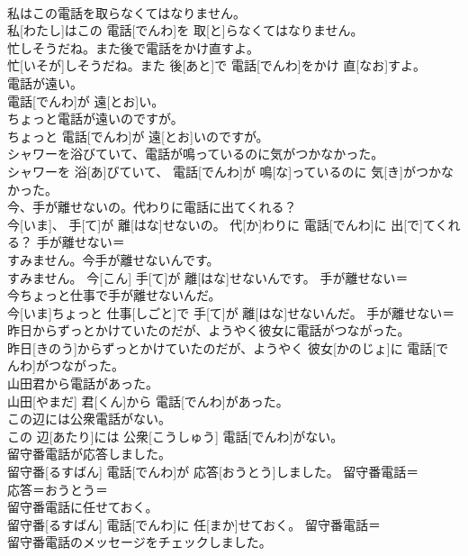 \documentclass[8pt]{extreport}
\begin{document}
\begin{CJK}{UTF8}{min}
\\	私はこの電話を取らなくてはなりません。	
\\	私[わたし]はこの 電話[でんわ]を 取[と]らなくてはなりません。	
\\	忙しそうだね。また後で電話をかけ直すよ。	
\\	忙[いそが]しそうだね。また 後[あと]で 電話[でんわ]をかけ 直[なお]すよ。	
\\	電話が遠い。	
\\	電話[でんわ]が 遠[とお]い。	
\\	ちょっと電話が遠いのですが。	
\\	ちょっと 電話[でんわ]が 遠[とお]いのですが。	
\\	シャワーを浴びていて、電話が鳴っているのに気がつかなかった。	
\\	シャワーを 浴[あ]びていて、 電話[でんわ]が 鳴[な]っているのに 気[き]がつかなかった。	
\\	今、手が離せないの。代わりに電話に出てくれる？	
\\	今[いま]、 手[て]が 離[はな]せないの。 代[か]わりに 電話[でんわ]に 出[で]てくれる？	手が離せない＝ 
\\	すみません。今手が離せないんです。	
\\	すみません。 今[こん] 手[て]が 離[はな]せないんです。	手が離せない＝ 
\\	今ちょっと仕事で手が離せないんだ。	
\\	今[いま]ちょっと 仕事[しごと]で 手[て]が 離[はな]せないんだ。	手が離せない＝ 
\\	昨日からずっとかけていたのだが、ようやく彼女に電話がつながった。	
\\	昨日[きのう]からずっとかけていたのだが、ようやく 彼女[かのじょ]に 電話[でんわ]がつながった。	
\\	山田君から電話があった。	
\\	山田[やまだ] 君[くん]から 電話[でんわ]があった。	
\\	この辺には公衆電話がない。	
\\	この 辺[あたり]には 公衆[こうしゅう] 電話[でんわ]がない。	
\\	留守番電話が応答しました。	
\\	留守番[るすばん] 電話[でんわ]が 応答[おうとう]しました。	留守番電話＝ 
\\	応答＝おうとう＝ 
\\	留守番電話に任せておく。	
\\	留守番[るすばん] 電話[でんわ]に 任[まか]せておく。	留守番電話＝ 
\\	留守番電話のメッセージをチェックしました。	

\end{CJK}
\end{document}
